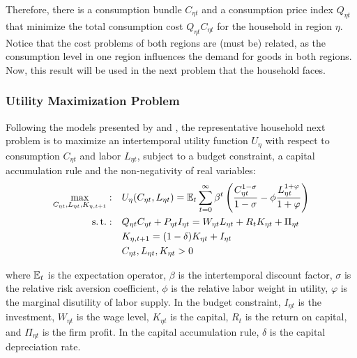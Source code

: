 \documentclass[../thesis.tex]{subfiles}
\begin{document}
	Therefore, there is a consumption bundle \(C_{\eta t}\) and a consumption price index \(Q_{\eta t}\) that minimize the total consumption cost \(Q_{\eta t} C_{\eta t}\) for the household in region \(\eta\). Notice that the cost problems of both regions are (must be) related, as the consumption level in one region influences the demand for goods in both regions. Now, this result will be used in the next problem that the household faces.

\subsubsection*{Utility Maximization Problem}

	Following the models presented by \textcite{costa_junior_understanding_2016} and \textcite{solis-garcia_ucb_2022}, the representative household next problem is to maximize an intertemporal utility function $U_{\eta}$ with respect to consumption $C_{\eta t}$ and labor $L_{\eta t}$, subject to a budget constraint, a capital accumulation rule and the non-negativity of real variables:
	\begin{align}
		\max_{C_{\eta t}, L_{\eta t}, K_{\eta,t+1}}: &\quad U_{\eta}(C_{\eta t},L_{\eta t}) = {\mathbb{E}_{t}} \sum_{t=0}^{\infty} \beta^t \left(\frac{C_{\eta t}^{1-\sigma}}{1-\sigma} - \phi \frac{L_{\eta t}^{1+\varphi}}{1+\varphi} \right) \label{ext-mod:reg-utility-function} 
		\\
		\operatorname{s.t.}: &\quad Q_{\eta t} C_{\eta t} + P_{\eta t} I_{\eta t} = W_{\eta t} L_{\eta t} + R_{t} K_{\eta t} + \Pi_{\eta t} \label{ext-mod:reg-budget-constraint} \\
		&\quad K_{\eta,t+1} = (1 - \delta) K_{\eta t} + I_{\eta t} \label{ext-mod:reg-law-of-motion-of-capital} \\
		&\quad C_{\eta t}, L_{\eta t}, K_{\eta t} > 0 \nonumber
	\end{align}

	where ${\mathbb{E}_{t}}$ is the expectation operator, $\beta$ is the intertemporal discount factor, $\sigma$ is the relative risk aversion coefficient, $\phi$ is the relative labor weight in utility, $\varphi$ is the marginal disutility of labor supply. In the budget constraint,
	$I_{\eta t}$ is the investment,
	$W_{\eta t}$ is the wage level,
	$K_{\eta t}$ is the capital, $R_{t}$ is the return on capital,
	and $\Pi_{\eta t}$ is the firm profit. In the capital accumulation rule, $\delta$ is the capital depreciation rate.
\end{document}
